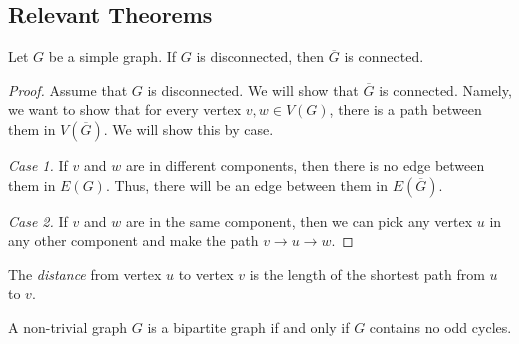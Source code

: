 \subsection{Relevant Theorems}

\begin{theorem}
  Let \(G\) be a simple graph. If \(G\) is disconnected, then \(\overline{G}\) is connected.
\end{theorem}

\begin{proof}
  Assume that \(G\) is disconnected. We will show that \(\overline{G}\) is
  connected. Namely, we want to show that for every vertex \(v, w \in
  V({G})\), there is a path between them in \(V(\overline{G})\). We will show
  this by case.

  \textit{Case 1.} If \(v\) and \(w\) are in different components, then there
  is no edge between them in \(E(G)\). Thus, there will be an edge between them
  in \(E(\overline{G})\).

  \textit{Case 2.} If \(v\) and \(w\) are in the same component, then we can
  pick any vertex \(u\) in any other component and make the path \(v \to u \to
  w\).
\end{proof}

\begin{definition}[Distance]
  The \textit{distance} from vertex \(u\) to vertex \(v\) is the length of the
  shortest path from \(u\) to \(v\).
\end{definition}

\begin{theorem}
  A non-trivial graph \(G\) is a bipartite graph if and only if \(G\) contains
  no odd cycles.
\end{theorem}

